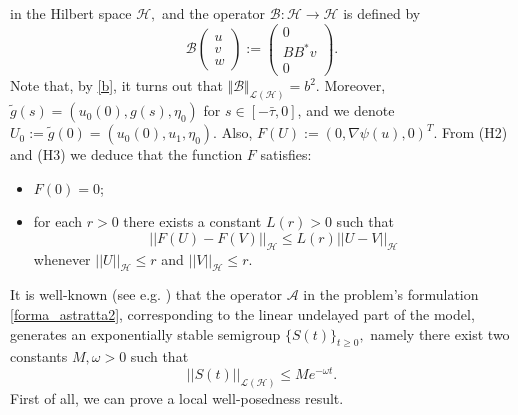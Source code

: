 \documentclass[11pt]{article}
\renewcommand{\geq}{\geqslant}
\renewcommand{\leq}{\leqslant}
\begin{document}
in the Hilbert space ${\mathcal H},$ and the operator ${\mathcal B}:{\mathcal H}\rightarrow {\mathcal H}$ is defined by
$${\mathcal B}\left (
\begin{array}{l}
u\\
v\\
w
\end{array}
\right ):= \left(
\begin{array}{l}
0\\
 BB^* v\\
 0
\end{array}
\right ).$$
Note that, by \eqref{b}, it turns out that $\Vert {\mathcal B}\Vert_{\mathcal{L(H)}} =b^2.$
Moreover,  $\tilde g(s)=(u_0(0), g(s), \eta_0)$ for $s\in [-\bar\tau, 0]$, and we denote $U_0:=\tilde{g}(0)=(u_0(0), u_1, \eta_0)$. Also, $F(U):= (0, \nabla\psi(u), 0)^T.$ From (H2) and (H3) we deduce that
the function $F$ satisfies:
\begin{itemize}
\item[{(F1)}] $F(0)=0$;
\item[{(F2)}] for each $r>0$ there exists a constant $L(r)>0$ such that
\begin{equation}\label{stimaF}
||F(U)-F(V)||_{\mathcal{H}}\leq L(r)||U-V||_{\mathcal{H}}
\end{equation}
whenever $||U||_{\mathcal{H}}\leq r$ and $||V||_{\mathcal{H}}\leq r$.
\end{itemize}
It is well-known (see e.g. \cite{Giorgi}) that the operator ${\mathcal A}$
in the problem's formulation \eqref{forma_astratta2}, corresponding to the linear undelayed part of the model, generates an exponentially stable semigroup
$\{S(t)\}_{t\geq0},$ namely there exist two constants
$M,\omega >0$ such that
\begin{equation}
	\label{semigruppo}
	||S(t)||_{\mathcal{L}(\mathcal{H})}\leq Me^{-\omega t}.
\end{equation}
First of all, we can prove a local well-posedness result.
\end{document}
